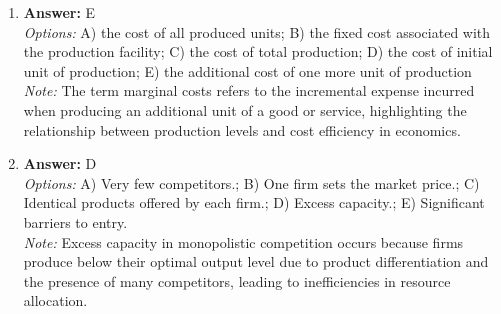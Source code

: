 \documentclass[12pt]{article}
\begin{document}
\begin{enumerate}[label=\arabic*.]
\item \textbf{Answer:} E
\\ \textit{Options:} A) the cost of all produced units; B) the fixed cost associated with the production facility; C) the cost of total production; D) the cost of initial unit of production; E) the additional cost of one more unit of production
\\ \textit{Note:} The term marginal costs refers to the incremental expense incurred when producing an additional unit of a good or service, highlighting the relationship between production levels and cost efficiency in economics.
\item \textbf{Answer:} D
\\ \textit{Options:} A) Very few competitors.; B) One firm sets the market price.; C) Identical products offered by each firm.; D) Excess capacity.; E) Significant barriers to entry.
\\ \textit{Note:} Excess capacity in monopolistic competition occurs because firms produce below their optimal output level due to product differentiation and the presence of many competitors, leading to inefficiencies in resource allocation.
\end{enumerate}
\end{document}
